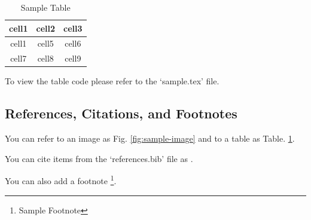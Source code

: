 \begin{table}[ht]
    \caption{Sample Table}
    \centering
    \begin{tabular}{ | c | c | c | }
        \hline
        cell1 & cell2 & cell3 \\
        \hline
        cell1 & cell5 & cell6 \\
        \hline
        cell7 & cell8 & cell9 \\
        \hline
    \end{tabular}
    \label{tab:sample-table}
\end{table}

\noindent To view the table code please refer to the `sample.tex' file.

\subsection{References, Citations, and Footnotes}

You can refer to an image as Fig. \ref{fig:sample-image} and to a table as Table. \ref{tab:sample-table}.

\noindent You can cite items from the `references.bib' file as \cite{10.5120/ijca2020920393}.

\noindent You can also add a footnote \footnote{Sample Footnote}.